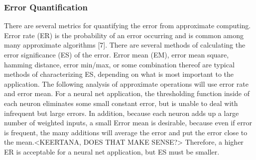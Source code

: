 \documentclass[journal]{IEEEtran}
\begin{document}
	\subsubsection{Error Quantification}
	\indent 	There are several metrics for quantifying the error from approximate computing. Error rate (ER) is the probability of an error occurring and is common among many approximate algorithms [7]. There are several methods of calculating the error significance (ES) of the error. Error mean (EM), error mean square, hamming distance, error min/max, or some combination thereof are typical methods of characterizing ES, depending on what is most important to the application. The following analysis of approximate operations will use error rate and error mean. For a neural net application, the thresholding function inside of each neuron eliminates some small constant error, but is unable to deal with infrequent but large errors. In addition, because each neuron adds up a large number of weighted inputs, a small Error mean is desirable, because even if error is frequent, the many additions will average the error and put the error close to the mean.<KEERTANA, DOES THAT MAKE SENSE?>  Therefore, a higher ER is acceptable for a neural net application, but ES must be smaller. \\	
	
\end{document}
